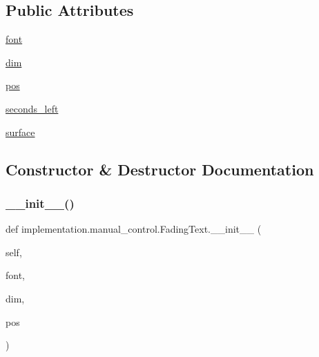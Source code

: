 \subsection*{Public Attributes}
\begin{DoxyCompactItemize}
\item 
\hyperlink{classimplementation_1_1manual__control_1_1_fading_text_a082fb4699489a87bdbacb57c98c12b03}{font}
\item 
\hyperlink{classimplementation_1_1manual__control_1_1_fading_text_a0f27882c9976418cb316d18dfb6fdfa0}{dim}
\item 
\hyperlink{classimplementation_1_1manual__control_1_1_fading_text_a37bc572c9faf6b8d5803e5a52bda25b7}{pos}
\item 
\hyperlink{classimplementation_1_1manual__control_1_1_fading_text_ac656b26edb4bfadbdd58e823d9500aeb}{seconds\+\_\+left}
\item 
\hyperlink{classimplementation_1_1manual__control_1_1_fading_text_a7c817f00bbeae6e99ca1079405516866}{surface}
\end{DoxyCompactItemize}


\subsection{Constructor \& Destructor Documentation}
\mbox{\label{classimplementation_1_1manual__control_1_1_fading_text_a53de3cc3e5cf3e7f33e0d8e58dcf5a65}} 
\subsubsection{\texorpdfstring{\+\_\+\+\_\+init\+\_\+\+\_\+()}{\_\_init\_\_()}}
{\footnotesize\ttfamily def implementation.\+manual\+\_\+control.\+Fading\+Text.\+\_\+\+\_\+init\+\_\+\+\_\+ (\begin{DoxyParamCaption}\item[{}]{self,  }\item[{}]{font,  }\item[{}]{dim,  }\item[{}]{pos }\end{DoxyParamCaption})}



